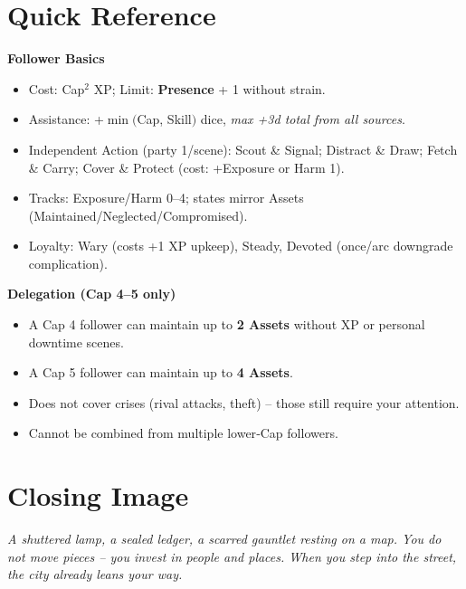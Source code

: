 \section*{Quick Reference}
\begin{tcolorbox}[colback=blue!5!white,colframe=blue!75!black,title=Followers Quick Reference,fonttitle=\bfseries]
\textbf{Follower Basics}
\begin{itemize}
  \item Cost: Cap\(^2\) XP; Limit: \textbf{Presence} + 1 without strain.
  \item Assistance: +\(\min(\)Cap, Skill\()\) dice, \textit{max +3d total from all sources}.
  \item Independent Action (party 1/scene): Scout \& Signal; Distract \& Draw; Fetch \& Carry; Cover \& Protect (cost: +Exposure or Harm 1).
  \item Tracks: Exposure/Harm 0--4; states mirror Assets (Maintained/Neglected/Compromised).
  \item Loyalty: Wary (costs +1 XP upkeep), Steady, Devoted (once/arc downgrade complication).
\end{itemize}

\textbf{Delegation (Cap 4--5 only)}
\begin{itemize}
  \item A Cap 4 follower can maintain up to \textbf{2 Assets} without XP or personal downtime scenes.
  \item A Cap 5 follower can maintain up to \textbf{4 Assets}.
  \item Does not cover crises (rival attacks, theft) -- those still require your attention.
  \item Cannot be combined from multiple lower‑Cap followers.
\end{itemize}
\end{tcolorbox}

\section*{Closing Image}
\textit{A shuttered lamp, a sealed ledger, a scarred gauntlet resting on a map. You do not move pieces -- you invest in people and places. When you step into the street, the city already leans your way.}